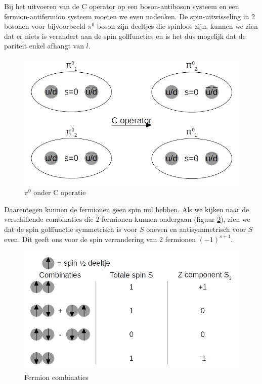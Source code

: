 \documentclass[../main.tex]{subfiles}
\begin{document}
Bij het uitvoeren van de C operator op een boson-antiboson systeem en een fermion-antifermion systeem moeten we even nadenken. De spin-uitwisseling in 2 bosonen voor bijvoorbeeld $\pi^0$ boson zijn deeltjes die spinloos zijn, kunnen we zien dat er niets is verandert aan de spin golffuncties en is het dus mogelijk dat de pariteit enkel afhangt van $l$.

\begin{figure}[h]
    \centering
    \includegraphics[width=0.8\linewidth]{quantum_numbers/baryon_c_operator.jpg}
    \caption{$\pi^0$ onder C operatie}%
    \label{fig:baryon_c_operator}
\end{figure}

Daarentegen kunnen de fermionen geen spin nul hebben. Als we kijken naar de verschillende combinaties die 2 fermionen kunnen ondergaan (figuur \ref{fig:fermion_c_operator}), zien we dat de spin golffunctie symmetrisch is voor $S$ oneven en antisymmetrisch voor $S$ even. Dit geeft ons voor de spin verrandering van 2 fermionen $(-1)^{s+1}$.

\begin{figure}[h]
    \centering
    \includegraphics[width=0.8\linewidth]{quantum_numbers/fermion_c_operator.jpg}
    \caption{Fermion combinaties}%
    \label{fig:fermion_c_operator}
\end{figure}
\end{document}
